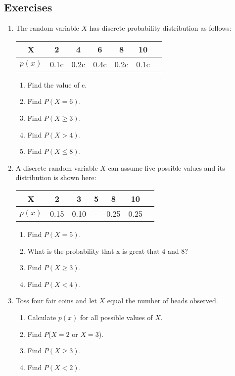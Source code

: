 \subsection{Exercises}

\begin{enumerate}
\item  The random variable $X$ has discrete probability distribution as follows:
\begin{center}
\begin{tabular}{ccccccc}\hline
X             &2       &4        &6        &8       &10\\ \hline
$p(x)$        &0.1c    &0.2c     &0.4c     &0.2c    &0.1c\\ \hline
\end{tabular}
\end{center}
\begin{enumerate}
\item Find the value of c.
\item Find $P(X=6)$.
\item Find $P(X \geq 3)$.
\item Find $P(X > 4)$.
\item Find $P(X \leq 8)$.
\end{enumerate}
\item  A discrete random variable $X$ can assume five possible values and its distribution is shown here:
\begin{center}
\begin{tabular}{ccccccc}\hline
X             &2       &3        &5        &8       &10\\ \hline
$p(x)$        &0.15    &0.10     &-        &0.25    &0.25\\ \hline
\end{tabular}
\end{center}


\begin{enumerate}
\item Find $P(X=5)$.
\item What is the probability that x is great that 4 and 8?
\item Find $P(X \geq 3)$.
\item Find $P(X < 4)$.
\end{enumerate}

\item  Toss four fair coins and let $X$ equal the number of heads observed.

\begin{enumerate}
\item Calculate $p(x)$ for all possible values of $X$.
\item Find $P$($X=2$ or $X=3$).
\item Find $P(X \geq 3)$.
\item Find $P(X < 2)$.
\end{enumerate}


\end{enumerate}
